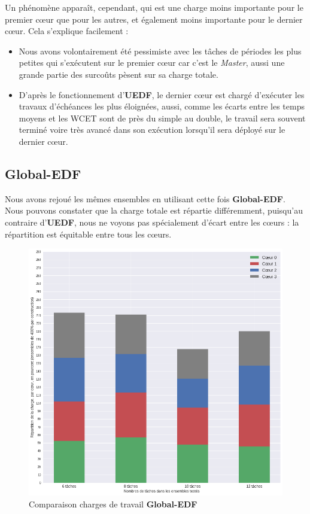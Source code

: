 	Un phénomène apparaît, cependant, qui est une charge moins importante pour le premier cœur que pour les autres, et également 
	moins importante pour le dernier cœur. Cela s'explique facilement : 
	\begin{itemize}
		\item Nous avons volontairement été pessimiste avec les tâches de périodes les plus petites qui s'exécutent sur le 
		premier cœur car c'est le \textit{Master}, aussi une grande partie des surcoûts pèsent sur sa charge totale.
		\item D'après le fonctionnement d'\textbf{UEDF}, le dernier cœur est chargé d'exécuter les travaux d'échéances les plus 
		éloignées, aussi, comme les écarts entre les temps moyens et les WCET sont de près du simple au double, 
		le travail sera souvent terminé voire très avancé dans son exécution lorsqu'il sera déployé sur le dernier cœur.
	\end{itemize}

	\subsection{Global-EDF}
	
	Nous avons rejoué les mêmes ensembles en utilisant cette fois \textbf{Global-EDF}. Nous pouvons constater que 
	la charge totale est répartie différemment, puisqu'au contraire d'\textbf{UEDF}, nous ne voyons pas spécialement d'écart 
	entre les cœurs : la répartition est équitable entre tous les cœurs. 
	
	\begin{figure}[H]
	\label{loadevolutionGEDF}
	\caption{Comparaison charges de travail \textbf{Global-EDF}}
	\includegraphics[scale=0.5]{img/wcet/repartitiondecharges_gedf}
	\end{figure}		

